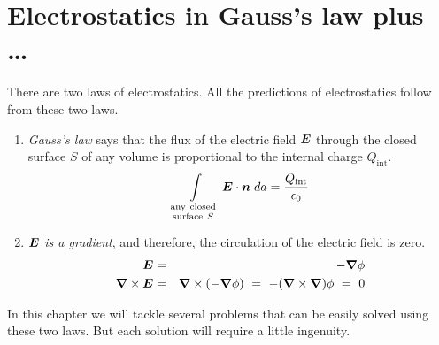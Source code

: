 \section{Electrostatics in Gauss's law plus \ldots}

There are two laws of electrostatics.
All the predictions of electrostatics follow from these two laws.
\begin{enumerate}

\item
  \emph{Gauss's law} says that the flux of the electric field $\boldsymbol{E}$ through the closed 
  surface $S$ of any volume is proportional to the internal charge $Q_{\mathrm{int}}$.
  \begin{equation*}
    \int\limits_{\genfrac{}{}{0pt}{1}{\mathrm{any\ closed}}{\mathrm{surface\ }S}}
    \bv{E} \cdot \bv{n} \; da = \frac{Q_{\mathrm{int}}}{\epsilon_0}
  \end{equation*}

\item
  \emph{$\boldsymbol{E}$ is a gradient}, and therefore,
  the circulation of the electric field is zero.
  \begin{eqnarray*}
    \bv{E} &=& - \grad \phi \\
    \grad \times \bv{E} &=& \grad \times (-\grad\phi) \ = \ -(\grad\times\grad)\phi \ = \ 0
  \end{eqnarray*}

\end{enumerate}

In this chapter we will tackle several problems that can be easily solved using these two laws.
But each solution will require a little ingenuity.

